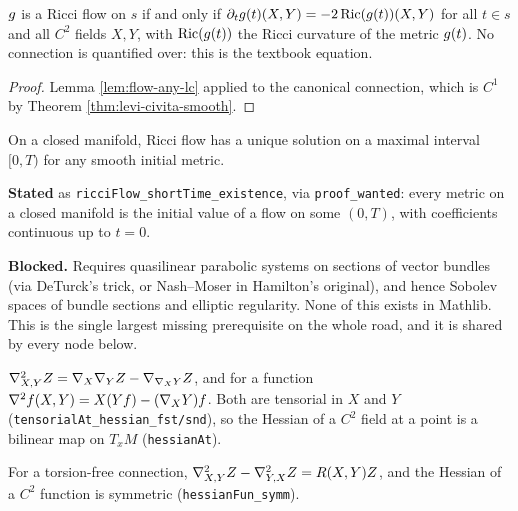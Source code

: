 \begin{lemma}
  \label{lem:flow-textbook}
  \leanok
  $g$ is a Ricci flow on $s$ if and only if
  $\partial_t g(t)(X, Y) = -2\operatorname{Ric}(g(t))(X, Y)$ for all $t \in s$ and all
  $C^2$ fields $X, Y$, with $\operatorname{Ric}(g(t))$ the Ricci curvature of the metric
  $g(t)$. No connection is quantified over: this is the textbook equation.
\end{lemma}

\begin{proof}
  \leanok
  Lemma \ref{lem:flow-any-lc} applied to the canonical connection, which is
  $C^1$ by Theorem \ref{thm:levi-civita-smooth}.
\end{proof}

\begin{theorem}
  \label{thm:short-time}
  On a closed manifold, Ricci flow has a unique solution on a maximal interval
  $[0,T)$ for any smooth initial metric.

  \textbf{Stated} as \texttt{ricciFlow\_shortTime\_existence}, via
  \texttt{proof\_wanted}: every metric on a closed manifold is the initial
  value of a flow on some $(0,T)$, with coefficients continuous up to $t = 0$.

  \textbf{Blocked.} Requires quasilinear parabolic systems on sections of
  vector bundles (via DeTurck's trick, or Nash--Moser in Hamilton's original),
  and hence Sobolev spaces of bundle sections and elliptic regularity. None of
  this exists in Mathlib. This is the single largest missing prerequisite on
  the whole road, and it is shared by every node below.
\end{theorem}

\begin{definition}
  \label{def:hessian}
  \leanok
  $\nabla^2_{X,Y} Z = \nabla_X \nabla_Y Z - \nabla_{\nabla_X Y} Z$, and for a function
  $\nabla^2 f(X,Y) = X(Yf) - (\nabla_X Y)f$. Both are tensorial in $X$ and $Y$
  (\texttt{tensorialAt\_hessian\_fst/snd}), so the Hessian of a $C^2$ field at a
  point is a bilinear map on $T_xM$ (\texttt{hessianAt}).
\end{definition}

\begin{lemma}
  \label{lem:ricci-identity}
  \leanok
  For a torsion-free connection,
  $\nabla^2_{X,Y} Z - \nabla^2_{Y,X} Z = R(X,Y)Z$, and the Hessian of a $C^2$
  function is symmetric (\texttt{hessianFun\_symm}).
\end{lemma}

